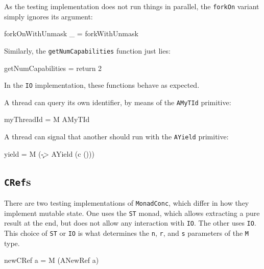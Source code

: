 As the testing implementation does not run things in parallel, the
\verb|forkOn| variant simply ignores its argument:

\begin{haskellcode}
forkOnWithUnmask _ = forkWithUnmask
\end{haskellcode}

Similarly, the \verb|getNumCapabilities| function just lies:

\begin{haskellcode}
getNumCapabilities = return 2
\end{haskellcode}

In the \verb|IO| implementation, these functions behave as expected.

A thread can query its own identifier, by means of the \verb|AMyTId|
primitive:

\begin{haskellcode}
myThreadId = M AMyTId
\end{haskellcode}


A thread can signal that another should run with the \verb|AYield|
primitive:

\begin{haskellcode}
yield = M (\c -> AYield (c ()))
\end{haskellcode}


\subsection{\texttt{CRef}s}
\label{sec:execution-primops-cref}

There are two testing implementations of \verb|MonadConc|, which
differ in how they implement mutable state. One uses the \verb|ST|
monad, which allows extracting a pure result at the end, but does not
allow any interaction with \verb|IO|. The other uses \verb|IO|. This
choice of \verb|ST| or \verb|IO| is what determines the \verb|n|,
\verb|r|, and \verb|s| parameters of the \verb|M| type.

\begin{haskellcode}
newCRef a = M (ANewRef a)
\end{haskellcode}

